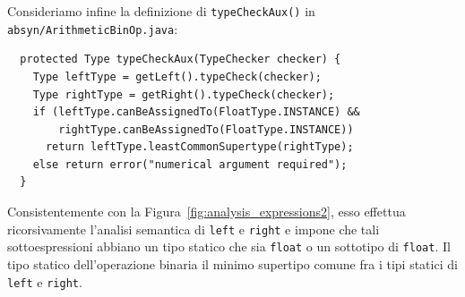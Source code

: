 Consideriamo infine la definizione di \texttt{typeCheckAux()}
in \texttt{absyn/ArithmeticBinOp.java}:
%
\begin{verbatim}
  protected Type typeCheckAux(TypeChecker checker) {
    Type leftType = getLeft().typeCheck(checker);
    Type rightType = getRight().typeCheck(checker);
    if (leftType.canBeAssignedTo(FloatType.INSTANCE) &&
        rightType.canBeAssignedTo(FloatType.INSTANCE))
      return leftType.leastCommonSupertype(rightType);
    else return error("numerical argument required");
  }
\end{verbatim}
%
Consistentemente con la Figura~\ref{fig:analysis_expressions2},
esso effettua ricorsivamente l'analisi semantica di
\texttt{left} e \texttt{right} e impone che tali sottoespressioni
abbiano un tipo statico
che sia \texttt{float} o un sottotipo di \texttt{float}. Il tipo statico
dell'operazione binaria \e il minimo supertipo comune fra i tipi
statici di \texttt{left} e \texttt{right}.
%
